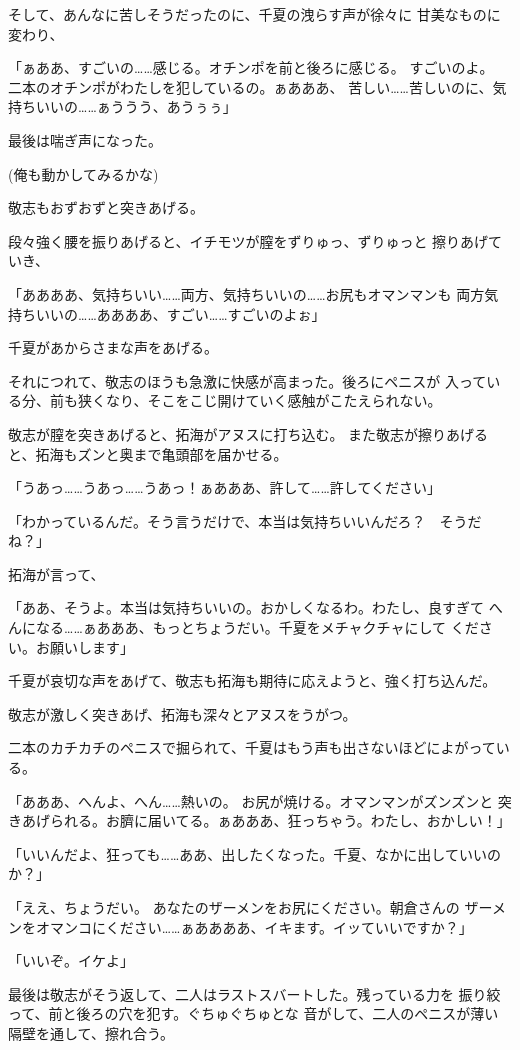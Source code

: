 ﻿\documentclass[
    book,tate,
    line_length=30zw,
    jafontsize=12pt,
    paper=b5j,
    landscape,
    ]{jlreq}
\begin{document}
そして、あんなに苦しそうだったのに、千夏の洩らす声が徐々に
甘美なものに変わり、

「ぁああ、すごいの……感じる。オチンポを前と後ろに感じる。
すごいのよ。 二本のオチンポがわたしを犯しているの。ぁあああ、
苦しい……苦しいのに、気持ちいいの……ぁううう、あうぅぅ」

最後は喘ぎ声になった。

(俺も動かしてみるかな)

敬志もおずおずと突きあげる。

段々強く腰を振りあげると、イチモツが膣をずりゅっ、ずりゅっと
擦りあげていき、

「ああああ、気持ちいい……両方、気持ちいいの……お尻もオマンマンも
両方気持ちいいの……ああああ、すごい……すごいのよぉ」

千夏があからさまな声をあげる。

それにつれて、敬志のほうも急激に快感が高まった。後ろにペニスが
入っている分、前も狭くなり、そこをこじ開けていく感触がこたえられない。

敬志が膣を突きあげると、拓海がアヌスに打ち込む。
また敬志が擦りあげると、拓海もズンと奥まで亀頭部を届かせる。

「うあっ……うあっ……うあっ！ぁあああ、許して……許してください」

「わかっているんだ。そう言うだけで、本当は気持ちいいんだろ？　そうだね？」

拓海が言って、

「ああ、そうよ。本当は気持ちいいの。おかしくなるわ。わたし、良すぎて
へんになる……ぁあああ、もっとちょうだい。千夏をメチャクチャにして
ください。お願いします」

千夏が哀切な声をあげて、敬志も拓海も期待に応えようと、強く打ち込んだ。

敬志が激しく突きあげ、拓海も深々とアヌスをうがつ。

二本のカチカチのペニスで掘られて、千夏はもう声も出さないほどによがっている。

「あああ、へんよ、へん……熱いの。 お尻が焼ける。オマンマンがズンズンと
突きあげられる。お臍に届いてる。ぁあああ、狂っちゃう。わたし、おかしい！」

「いいんだよ、狂っても……ああ、出したくなった。千夏、なかに出していいのか？」

「ええ、ちょうだい。 あなたのザーメンをお尻にください。朝倉さんの
ザーメンをオマンコにください……ぁああああ、イキます。イッていいですか？」

「いいぞ。イケよ」

最後は敬志がそう返して、二人はラストスバートした。残っている力を
振り絞って、前と後ろの穴を犯す。ぐちゅぐちゅとな
音がして、二人のペニスが薄い隔壁を通して、擦れ合う。
\end{document}

